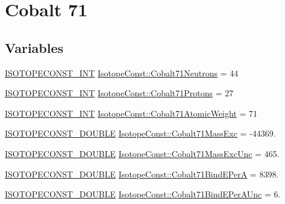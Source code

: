 \hypertarget{group___isotope_const-_cobalt-_co71}{}\section{Cobalt 71}
\label{group___isotope_const-_cobalt-_co71}
\subsection*{Variables}
\begin{DoxyCompactItemize}
\item 
\mbox{\hyperlink{group___isotope_const-_macros_ga5f18360b3e99483a35c32d789e62621c}{I\+S\+O\+T\+O\+P\+E\+C\+O\+N\+S\+T\+\_\+\+I\+NT}} \mbox{\hyperlink{group___isotope_const-_cobalt-_co71_ga2586fe97e524d304d48f07218544ccd7}{Isotope\+Const\+::\+Cobalt71\+Neutrons}} = 44
\item 
\mbox{\hyperlink{group___isotope_const-_macros_ga5f18360b3e99483a35c32d789e62621c}{I\+S\+O\+T\+O\+P\+E\+C\+O\+N\+S\+T\+\_\+\+I\+NT}} \mbox{\hyperlink{group___isotope_const-_cobalt-_co71_ga1d53361cd9885645c723fea4d1c7f148}{Isotope\+Const\+::\+Cobalt71\+Protons}} = 27
\item 
\mbox{\hyperlink{group___isotope_const-_macros_ga5f18360b3e99483a35c32d789e62621c}{I\+S\+O\+T\+O\+P\+E\+C\+O\+N\+S\+T\+\_\+\+I\+NT}} \mbox{\hyperlink{group___isotope_const-_cobalt-_co71_gadcdd6de49d5b9e2c7cfe45afe008e914}{Isotope\+Const\+::\+Cobalt71\+Atomic\+Weight}} = 71
\item 
\mbox{\hyperlink{group___isotope_const-_macros_ga8f45a7272ce02c0b4c65c44636ed719a}{I\+S\+O\+T\+O\+P\+E\+C\+O\+N\+S\+T\+\_\+\+D\+O\+U\+B\+LE}} \mbox{\hyperlink{group___isotope_const-_cobalt-_co71_ga0ea36fafe176f7290a61432639e760ec}{Isotope\+Const\+::\+Cobalt71\+Mass\+Exc}} = -\/44369.
\item 
\mbox{\hyperlink{group___isotope_const-_macros_ga8f45a7272ce02c0b4c65c44636ed719a}{I\+S\+O\+T\+O\+P\+E\+C\+O\+N\+S\+T\+\_\+\+D\+O\+U\+B\+LE}} \mbox{\hyperlink{group___isotope_const-_cobalt-_co71_gaf5c270425197be5574a4b8339dcae44d}{Isotope\+Const\+::\+Cobalt71\+Mass\+Exc\+Unc}} = 465.
\item 
\mbox{\hyperlink{group___isotope_const-_macros_ga8f45a7272ce02c0b4c65c44636ed719a}{I\+S\+O\+T\+O\+P\+E\+C\+O\+N\+S\+T\+\_\+\+D\+O\+U\+B\+LE}} \mbox{\hyperlink{group___isotope_const-_cobalt-_co71_ga6de2b699f4d2cbf75cba175632ae37de}{Isotope\+Const\+::\+Cobalt71\+Bind\+E\+PerA}} = 8398.
\item 
\mbox{\hyperlink{group___isotope_const-_macros_ga8f45a7272ce02c0b4c65c44636ed719a}{I\+S\+O\+T\+O\+P\+E\+C\+O\+N\+S\+T\+\_\+\+D\+O\+U\+B\+LE}} \mbox{\hyperlink{group___isotope_const-_cobalt-_co71_gae9b38ccbc99ccd9f4f916ad882a2605b}{Isotope\+Const\+::\+Cobalt71\+Bind\+E\+Per\+A\+Unc}} = 6.

\end{DoxyCompactItemize}
